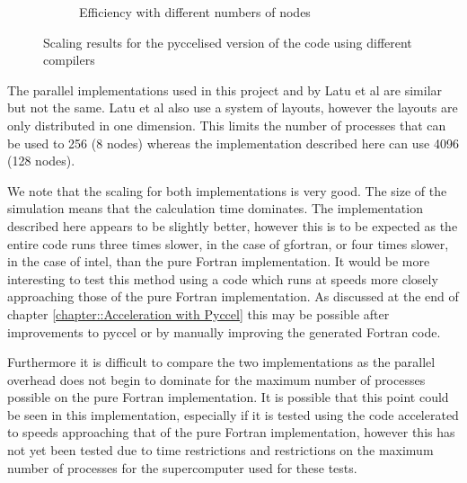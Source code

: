 \begin{figure}
\begin{subfigure}[t]{0.45\textwidth}
 \caption{\label{fig::Efficiency}Efficiency with different numbers of nodes}
\end{subfigure}
\caption{\label{fig::Scaling results} Scaling results for the pyccelised version of the code using different compilers}
\end{figure}

The parallel implementations used in this project and by Latu et al are similar but not the same. Latu et al also use a system of layouts, however the layouts are only distributed in one dimension. This limits the number of processes that can be used to 256 (8 nodes) whereas the implementation described here can use 4096 (128 nodes).

We note that the scaling for both implementations is very good. The size of the simulation means that the calculation time dominates. The implementation described here appears to be slightly better, however this is to be expected as the entire code runs three times slower, in the case of gfortran, or four times slower, in the case of intel, than the pure Fortran implementation. It would be more interesting to test this method using a code which runs at speeds more closely approaching those of the pure Fortran implementation. As discussed at the end of chapter \ref{chapter::Acceleration with Pyccel} this may be possible after improvements to pyccel or by manually improving the generated Fortran code.

Furthermore it is difficult to compare the two implementations as the parallel overhead does not begin to dominate for the maximum number of processes possible on the pure Fortran implementation. It is possible that this point could be seen in this implementation, especially if it is tested using the code accelerated to speeds approaching that of the pure Fortran implementation, however this has not yet been tested due to time restrictions and restrictions on the maximum number of processes for the supercomputer used for these tests.